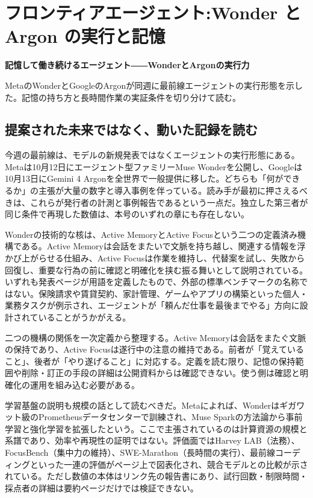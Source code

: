 \documentclass[lualatex,a4paper,10pt]{jlreq}
\begin{document}
\surveycover
\clearpage
\twocolumn
\section{フロンティアエージェント:Wonder と Argon の実行と記憶}
\label{sec:P1}

{\Large\bfseries 記憶して働き続けるエージェント――WonderとArgonの実行力\par}
\smallskip
{\color{SurveyMuted}MetaのWonderとGoogleのArgonが同週に最前線エージェントの実行形態を示した。記憶の持ち方と長時間作業の実証条件を切り分けて読む。\par}
\bigskip

\subsection*{提案された未来ではなく、動いた記録を読む}
今週の最前線は、モデルの新規発表ではなくエージェントの実行形態にある。Metaは10月12日にエージェント型ファミリーMuse Wonderを公開し、Googleは10月13日にGemini 4 Argonを全世界で一般提供に移した。どちらも「何ができるか」の主張が大量の数字と導入事例を伴っている。読み手が最初に押さえるべきは、これらが発行者の計測と事例報告であるという一点だ。独立した第三者が同じ条件で再現した数値は、本号のいずれの章にも存在しない。

Wonderの技術的な核は、Active MemoryとActive Focusという二つの定義済み機構である。Active Memoryは会話をまたいで文脈を持ち越し、関連する情報を浮かび上がらせる仕組み、Active Focusは作業を維持し、代替案を試し、失敗から回復し、重要な行為の前に確認と明確化を挟む振る舞いとして説明されている。いずれも発表ページが用語を定義したもので、外部の標準ベンチマークの名称ではない。保険請求や賃貸契約、家計管理、ゲームやアプリの構築といった個人・業務タスクが例示され、エージェントが「頼んだ仕事を最後までやる」方向に設計されていることがうかがえる。

二つの機構の関係を一次定義から整理する。Active Memoryは会話をまたぐ文脈の保持であり、Active Focusは遂行中の注意の維持である。前者が「覚えていること」、後者が「やり遂げること」に対応する。定義を読む限り、記憶の保持範囲や削除・訂正の手段の詳細は公開資料からは確認できない。使う側は確認と明確化の運用を組み込む必要がある。

学習基盤の説明も規模の話として読むべきだ。Metaによれば、Wonderはギガワット級のPrometheusデータセンターで訓練され、Muse Sparkの方法論から事前学習と強化学習を拡張したという。ここで主張されているのは計算資源の規模と系譜であり、効率や再現性の証明ではない。評価面ではHarvey LAB（法務）、FocusBench（集中力の維持）、SWE-Marathon（長時間の実行）、最前線コーディングといった一連の評価がページ上で図表化され、競合モデルとの比較が示されている。ただし数値の本体はリンク先の報告書にあり、試行回数・制限時間・採点者の詳細は要約ページだけでは検証できない。
\end{document}
